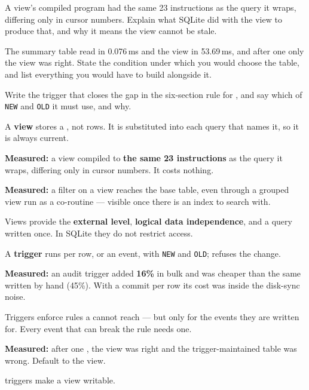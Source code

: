 \begin{checkpoint}
\begin{tightnum}
  \item A view's compiled program had the same 23 instructions as the query it
        wraps, differing only in cursor numbers. Explain what SQLite did with
        the view to produce that, and why it means the view cannot be stale.
  \item The summary table read in 0.076\,ms and the view in 53.69\,ms, and
        after one  only the view was right. State the condition
        under which you would choose the table, and list everything you would
        have to build alongside it.
  \item Write the trigger that closes the gap in the six-section rule for
        , and say which of \texttt{NEW} and \texttt{OLD} it must
        use, and why.
\end{tightnum}
\end{checkpoint}

\begin{chaptersummary}
\begin{tight}
  \item A \textbf{view} stores a , not rows. It is substituted
        into each query that names it, so it is always current.
  \item \textbf{Measured:} a view compiled to \textbf{the same 23
        instructions} as the query it wraps, differing only in cursor
        numbers. It costs nothing.
  \item \textbf{Measured:} a filter on a view reaches the base table, even
        through a grouped view run as a co-routine --- visible once there is an
        index to search with.
  \item Views provide the \textbf{external level}, \textbf{logical data
        independence}, and a query written once. In SQLite they do not restrict
        access.
  \item A \textbf{trigger} runs per row,  or  an
        event, with \texttt{NEW} and \texttt{OLD}; 
        refuses the change.
  \item \textbf{Measured:} an audit trigger added \textbf{16\%} in bulk and was
        cheaper than the same  written by hand (45\%). With a
        commit per row its cost was inside the disk-sync noise.
  \item Triggers enforce rules a  cannot reach --- but only for
        the events they are written for. Every event that can break the rule
        needs one.
  \item \textbf{Measured:} after one , the view was right and
        the trigger-maintained table was wrong. Default to the view.
  \item {} triggers make a view writable.
\end{tight}
\end{chaptersummary}

